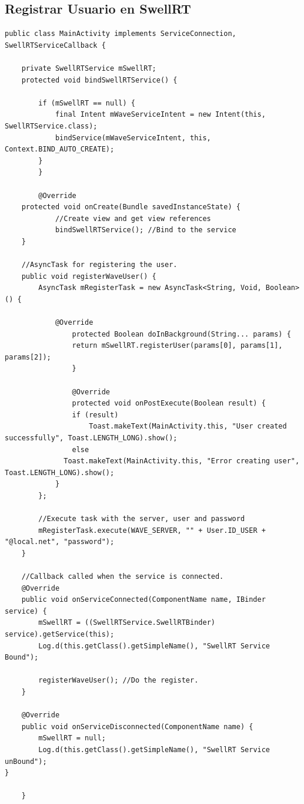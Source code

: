 \subsection{Registrar Usuario en SwellRT} \label{ssec:waveRegister}

	  \begin{lstlisting}[frame=single]	  
public class MainActivity implements ServiceConnection, SwellRTServiceCallback {
	  
	private SwellRTService mSwellRT;	  	  
	protected void bindSwellRTService() {

        if (mSwellRT == null) {
            final Intent mWaveServiceIntent = new Intent(this, SwellRTService.class);
            bindService(mWaveServiceIntent, this, Context.BIND_AUTO_CREATE);
        }
    	}
   		
    	@Override
    protected void onCreate(Bundle savedInstanceState) {
    		//Create view and get view references    		
    		bindSwellRTService(); //Bind to the service  		
    }
    
    //AsyncTask for registering the user.
    public void registerWaveUser() {
        AsyncTask mRegisterTask = new AsyncTask<String, Void, Boolean>() {

       		@Override
        		protected Boolean doInBackground(String... params) {
           		return mSwellRT.registerUser(params[0], params[1], params[2]);
        		}

        		@Override
        		protected void onPostExecute(Boolean result) {
          		if (result)
              		Toast.makeText(MainActivity.this, "User created successfully", Toast.LENGTH_LONG).show();
           		else
              Toast.makeText(MainActivity.this, "Error creating user", Toast.LENGTH_LONG).show();
            }
        };
		
		//Execute task with the server, user and password
        mRegisterTask.execute(WAVE_SERVER, "" + User.ID_USER + "@local.net", "password");
    }

	//Callback called when the service is connected.
    @Override
    public void onServiceConnected(ComponentName name, IBinder service) {
        mSwellRT = ((SwellRTService.SwellRTBinder) service).getService(this);
        Log.d(this.getClass().getSimpleName(), "SwellRT Service Bound");
        
        registerWaveUser(); //Do the register.
    }

    @Override
    public void onServiceDisconnected(ComponentName name) {
        mSwellRT = null;
        Log.d(this.getClass().getSimpleName(), "SwellRT Service unBound");
}	
    
    }
    
	  \end{lstlisting}
	  
